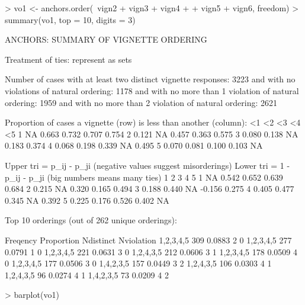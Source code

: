 \documentclass{amsart}
\begin{document}
\begin{Schunk}
\begin{Sinput}
> vo1 <- anchors.order(~vign2 + vign3 + vign4 + 
+     vign5 + vign6, freedom)
> summary(vo1, top = 10, digits = 3)
\end{Sinput}
\begin{Soutput}
ANCHORS: SUMMARY OF VIGNETTE ORDERING

Treatment of ties: represent as sets 

Number of cases with at least two distinct vignette responses: 3223 
and with no violations of natural ordering: 1178 
and with no more than 1 violation of natural ordering: 1959 
and with no more than 2 violation of natural ordering: 2621 

Proportion of cases a vignette (row) is less than another (column):
     <1    <2    <3    <4    <5
1    NA 0.663 0.732 0.707 0.754
2 0.121    NA 0.457 0.363 0.575
3 0.080 0.138    NA 0.183 0.374
4 0.068 0.198 0.339    NA 0.495
5 0.070 0.081 0.100 0.103    NA

Upper tri =     p_{ij} - p_{ji} (negative values suggest misorderings)
Lower tri = 1 - p_{ij} - p_{ji} (big numbers means many ties)
      1     2     3      4     5
1    NA 0.542 0.652  0.639 0.684
2 0.215    NA 0.320  0.165 0.494
3 0.188 0.440    NA -0.156 0.275
4 0.405 0.477 0.345     NA 0.392
5 0.225 0.176 0.526  0.402    NA

Top 10 orderings (out of 262 unique orderings):

              Freqency Proportion Ndistinct Nviolation
1,{2,3,4,5}        309     0.0883         2          0
{1,2,3,4,5}        277     0.0791         1          0
1,2,{3,4,5}        221     0.0631         3          0
1,{2,4},{3,5}      212     0.0606         3          1
1,2,{3,4},5        178     0.0509         4          0
1,{2,3,4},5        177     0.0506         3          0
1,4,{2,3,5}        157     0.0449         3          2
1,2,4,{3,5}        106     0.0303         4          1
1,{2,4},3,5         96     0.0274         4          1
1,4,2,{3,5}         73     0.0209         4          2
\end{Soutput}
\begin{Sinput}
> barplot(vo1)
\end{Sinput}
\end{Schunk}
\end{document}

